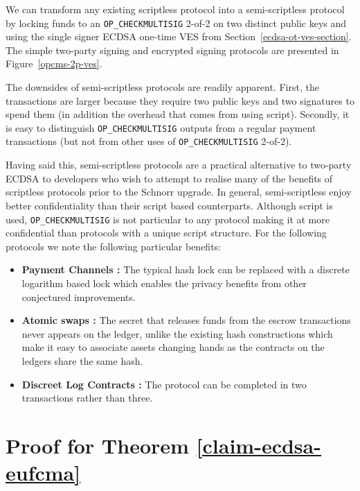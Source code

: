 \documentclass[fullpage]{article}
\theoremstyle{definition}
\newcommand{\OPCHECKMULTISIG}{\texttt{OP\_CHECKMULTISIG}\xspace}
\begin{document}
We can transform any existing scriptless protocol into a semi-scriptless protocol by locking funds to an \OPCHECKMULTISIG 2-of-2 on two distinct public keys and using the single signer ECDSA one-time VES from Section~\ref{ecdsa-ot-ves-section}. The simple two-party signing and encrypted signing protocols are presented in Figure~\ref{opcms-2p-ves}.

The downsides of semi-scriptless protocols are readily apparent. First, the transactions are larger because they require two public keys and two signatures to spend them (in addition the overhead that comes from using script). Secondly, it is easy to distinguish \OPCHECKMULTISIG outputs from a regular payment transactions (but not from other uses of \OPCHECKMULTISIG 2-of-2).

Having said this, semi-scriptless protocols are a practical alternative to two-party ECDSA to developers who wish to attempt to realise many of the benefits of scriptless protocols prior to the Schnorr upgrade. In general, semi-scriptless enjoy better confidentiality than their script based counterparts. Although script is used, \OPCHECKMULTISIG is not particular to any protocol making it at more confidential than protocols with a unique script structure. For the following protocols we note the following particular benefits:

\begin{itemize}
    \item \textbf{Payment Channels \cite{poon2016bitcoin}:} The typical hash lock can be replaced with a discrete logarithm based lock which enables the privacy benefits from \cite{cryptoeprint:2018:472} other conjectured improvements\cite{lightning-dev-scriptless-scripts}.
    \item \textbf{Atomic swaps \cite{scriptless-atomic-swap}:} The secret that releases funds from the escrow transactions never appears on the ledger, unlike the existing hash constructions which make it easy to associate assets changing hands as the contracts on the ledgers share the same hash.
    \item \textbf{Discreet Log Contracts \cite{dryja2017discreet}:} The protocol can be completed in two transactions rather than three.
\end{itemize}

\FloatBarrier
{}


\appendix
\section{ Proof for Theorem \ref{claim-ecdsa-eufcma}}
\end{document}
